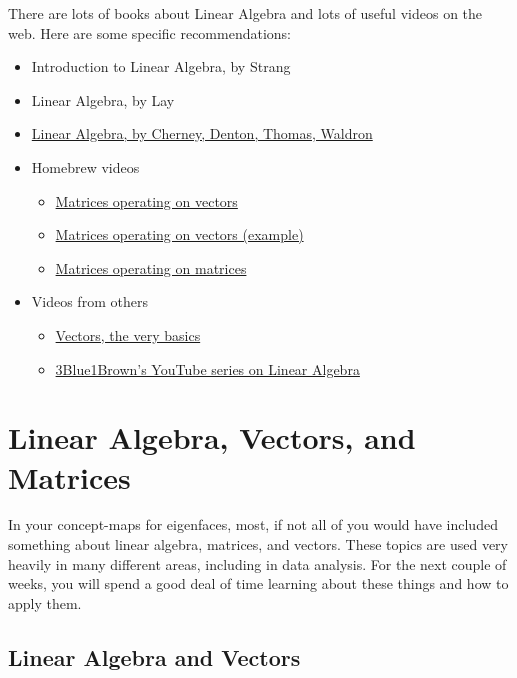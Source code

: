 There are lots of books about Linear Algebra and lots of useful videos on the web. Here are some specific recommendations:
\begin{itemize}
\item Introduction to Linear Algebra, by Strang
\item Linear Algebra, by Lay
\item \href{https://www.math.ucdavis.edu/~linear/}{Linear Algebra, by Cherney, Denton, Thomas, Waldron}
\item Homebrew videos
\begin{itemize}
\item \href{https://youtu.be/XSNHG1Vkcik}{Matrices operating on vectors}
\item \href{https://youtu.be/T5Larkrb430}{Matrices operating on vectors (example)}
\item \href{https://youtu.be/_cQq85Th6nI}{Matrices operating on matrices}
\end{itemize}
\item Videos from others
\begin{itemize}
\item \href{https://youtu.be/fNk_zzaMoSs}{Vectors, the very basics}
\item \href{https://www.youtube.com/playlist?list=PLZHQObOWTQDPD3MizzM2xVFitgF8hE_ab}{3Blue1Brown's YouTube series on Linear Algebra}
\end{itemize}
\end{itemize}



\section{Linear Algebra, Vectors, and Matrices}

In your concept-maps for eigenfaces, most, if not all of you would have included something about linear algebra, matrices, and vectors. These topics are used very heavily in many different areas, including in data analysis. For the next couple of weeks, you will spend a good deal of time learning about these things and how to apply them.

\subsection{Linear Algebra and Vectors}

